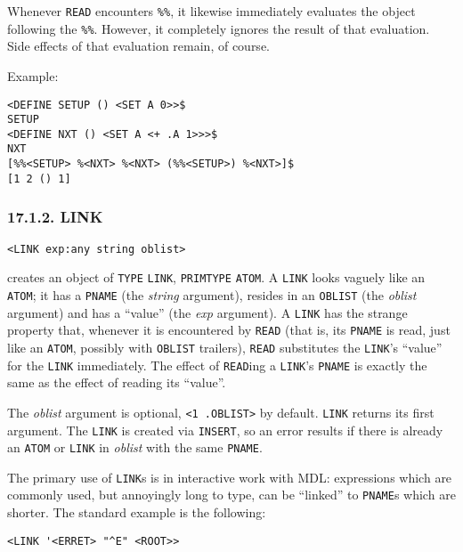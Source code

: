 \documentclass[a4paper,]{article}
\begin{document}
Whenever \texttt{READ} encounters \texttt{\%\%}, it likewise immediately evaluates the object following the \texttt{\%\%}.
However, it completely ignores the result of that evaluation. Side effects of that evaluation remain, of course.

Example:

\begin{verbatim}
<DEFINE SETUP () <SET A 0>>$
SETUP
<DEFINE NXT () <SET A <+ .A 1>>>$
NXT
[%%<SETUP> %<NXT> %<NXT> (%%<SETUP>) %<NXT>]$
[1 2 () 1]
\end{verbatim}

\subsubsection{17.1.2. LINK}\label{link}

\begin{verbatim}
<LINK exp:any string oblist>
\end{verbatim}

 creates an object of \texttt{TYPE} \texttt{LINK}, \texttt{PRIMTYPE} \texttt{ATOM}. A
\texttt{LINK} looks vaguely like an \texttt{ATOM}; it has a \texttt{PNAME} (the \emph{string} argument), resides in an
\texttt{OBLIST} (the \emph{oblist} argument) and has a ``value'' (the \emph{exp} argument). A \texttt{LINK} has the strange
property that, whenever it is encountered by \texttt{READ} (that is, its \texttt{PNAME} is read, just like an
\texttt{ATOM}, possibly with \texttt{OBLIST} trailers), \texttt{READ} substitutes the \texttt{LINK}'s ``value'' for the
\texttt{LINK} immediately. The effect of \texttt{READ}ing a \texttt{LINK}'s \texttt{PNAME} is exactly the same as the
effect of reading its ``value''.

The \emph{oblist} argument is optional, \texttt{\textless{}1\ .OBLIST\textgreater{}} by default. \texttt{LINK} returns its
first argument. The \texttt{LINK} is created via \texttt{INSERT}, so an error results if there is already an \texttt{ATOM}
or \texttt{LINK} in \emph{oblist} with the same \texttt{PNAME}.

The primary use of \texttt{LINK}s is in interactive work with MDL: expressions which are commonly used, but annoyingly long
to type, can be ``linked'' to \texttt{PNAME}s which are shorter. The standard example is the following:

\begin{verbatim}
<LINK '<ERRET> "^E" <ROOT>>
\end{verbatim}
\end{document}
